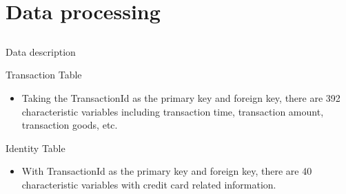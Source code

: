



% 



% 



\section{Data processing} \subsection{}

\begin{frame}{Data description}
	
	\begin{block}{Transaction Table}
		
		\begin{itemize}
			\item
			Taking the TransactionId as the primary key and foreign key, there are 392 characteristic variables including transaction time, transaction amount, transaction goods, etc.
		\end{itemize}
	
	\end{block}
	
	\begin{block}{Identity Table}
	    \begin{itemize}
	        \item 
	        With TransactionId as the primary key and foreign key, there are 40 characteristic variables with credit card related information.
	    \end{itemize}
			
		
	\end{block}
	
\end{frame}


